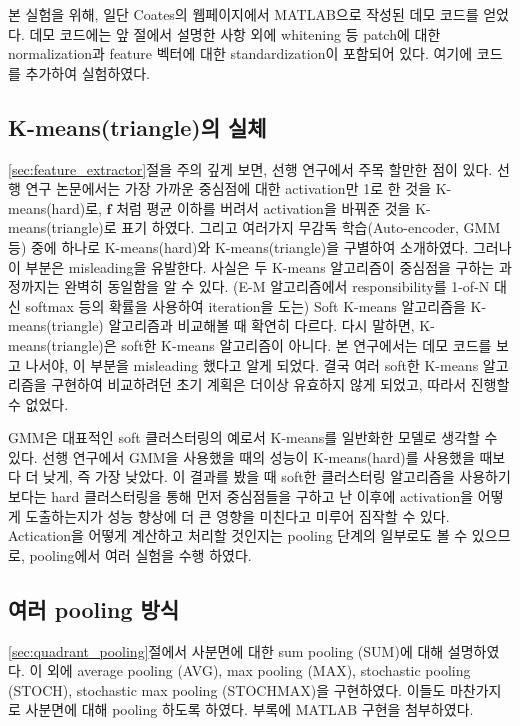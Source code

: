 \documentclass[a4paper,9pt]{article}
\begin{document}
\begin{multicols*}{2}
본 실험을 위해, 일단 Coates의 웹페이지에서 MATLAB으로 작성된 데모 코드를 얻었다.
데모 코드에는 앞 절에서 설명한 사항 외에 whitening 등 patch에 대한 normalization과 feature 벡터에 대한 standardization이 포함되어 있다.
여기에 코드를 추가하여 실험하였다.

\subsection{K-means(triangle)의 실체}

\ref{sec:feature_extractor}절을 주의 깊게 보면, 선행 연구에서 주목 할만한 점이 있다.
선행 연구 논문에서는 가장 가까운 중심점에 대한 activation만 1로 한 것을 K-means(hard)로, $\mathbf{f}$ 처럼 평균 이하를 버려서 activation을 바꿔준 것을 K-means(triangle)로 표기 하였다.
그리고 여러가지 무감독 학습(Auto-encoder, GMM 등) 중에 하나로 K-means(hard)와 K-means(triangle)을 구별하여 소개하였다.
그러나 이 부분은 misleading을 유발한다.
사실은 두 K-means 알고리즘이 중심점을 구하는 과정까지는 완벽히 동일함을 알 수 있다.
(E-M 알고리즘에서 responsibility를 1-of-N 대신 softmax 등의 확률을 사용하여 iteration을 도는) Soft K-means 알고리즘을 K-means(triangle) 알고리즘과 비교해볼 때 확연히 다르다.
다시 말하면, K-means(triangle)은 soft한 K-means 알고리즘이 아니다.
본 연구에서는 데모 코드를 보고 나서야, 이 부분을 misleading 했다고 알게 되었다.
결국 여러 soft한 K-means 알고리즘을 구현하여 비교하려던 초기 계획은 더이상 유효하지 않게 되었고, 따라서 진행할 수 없었다.

GMM은 대표적인 soft 클러스터링의 예로서 K-means를 일반화한 모델로 생각할 수 있다.
선행 연구에서 GMM을 사용했을 때의 성능이 K-means(hard)를 사용했을 때보다 더 낮게, 즉 가장 낮았다.
이 결과를 봤을 때 soft한 클러스터링 알고리즘을 사용하기 보다는 hard 클러스터링을 통해 먼저 중심점들을 구하고 난 이후에 activation을 어떻게 도출하는지가 성능 향상에 더 큰 영향을 미친다고 미루어 짐작할 수 있다.
Actication을 어떻게 계산하고 처리할 것인지는 pooling 단계의 일부로도 볼 수 있으므로, pooling에서 여러 실험을 수행 하였다.

\subsection{여러 pooling 방식}

\ref{sec:quadrant_pooling}절에서 사분면에 대한 sum pooling (SUM)에 대해 설명하였다.
이 외에 average pooling (AVG), max pooling (MAX), stochastic pooling (STOCH), stochastic max pooling (STOCHMAX)을 구현하였다.
이들도 마찬가지로 사분면에 대해 pooling 하도록 하였다.
부록에 MATLAB 구현을 첨부하였다.


\end{multicols*}
\end{document}
